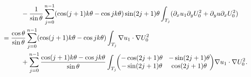 \documentclass[JEP,XML,SOM,Unicode,ThmDefs,NoFloatCountersInSection,published]{cedram}
\newcommand{\colsep}{\arraycolsep4.5pt}
\theoremstyle{plain}
\theoremstyle{definition}
\begin{document}
\begin{align*}
&\hspace*{1cm}-\frac{1}{\sin \theta}\sum_{j=0}^{n-1} (\cos(j+1)k\theta-\cos jk\theta)\sin(2j+1)\theta
\int_{T_j} (\partial_x u_1 \partial_y U_0^2 + \partial_y u \partial_x U_0^2)\\
&=\frac{\cos \theta}{\sin \theta}\sum_{j=0}^{n-1} (\cos(j+1)k\theta-\cos jk\theta) \int_{T_j} \nabla u_1 \cdot \nabla U_0^2\\
&\hspace*{1cm}+ \sum_{j=0}^{n-1} \frac{\cos(j+1)k\theta-\cos jk\theta}{\sin \theta} \int_{T_j}\colsep\hspace*{-1mm}
\begin{pmatrix}
-\cos(2j+1)\theta & -\sin(2j+1)\theta \\
-\sin(2j+1)\theta & \cos(2j+1)\theta
\end{pmatrix}\!\nabla u_1 \cdot \nabla U_0^2.
\end{align*}
\egroup\newpage
\end{document}
